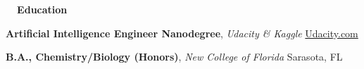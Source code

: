 \documentclass[a4paper,12pt]{article}
\newcommand{\resheading}[1]{{\vspace*{.06in} \colorbox{mygrey}{\begin{minipage}{\textwidth}{\textmd{\large \textbf{#1} \vphantom{p\^{E}}}}\end{minipage}}} }
\newcommand{\ressubheading}[4]{
        \textbf{#1} \hfill #2\\
        \textit{#3} \hfill #4 \\}
\begin{document}
\resheading{~~Education}

\textbf{Artificial Intelligence Engineer Nanodegree}, \textit{Udacity \& Kaggle} \hfill {\href{https://www.udacity.com/nanodegree}{Udacity.com}}
 
\textbf{B.A., Chemistry/Biology (Honors)}, \textit{New College of Florida} \hfill Sarasota, FL

 
\end{document}
